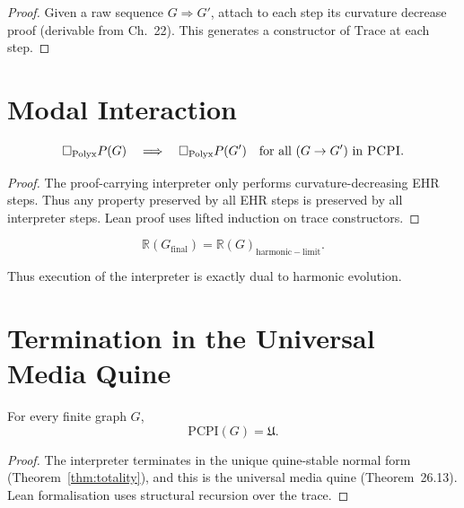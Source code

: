 \begin{proof}
Given a raw sequence $G\Rightarrow G'$, attach to each step its curvature
decrease proof (derivable from Ch.~22).  
This generates a constructor of $\mathrm{Trace}$ at each step.
\end{proof}


\section{Modal Interaction}
\label{sec:modal-interaction}

\begin{theorem}
\[
\Box_{\mathrm{Polyx}} P(G)
\quad\Longrightarrow\quad
\Box_{\mathrm{Polyx}} P(G')
\quad\text{for all $(G\to G')$ in \textsc{PCPI}.}
\]
\end{theorem}

\begin{proof}
The proof-carrying interpreter only performs curvature-decreasing EHR
steps.  
Thus any property preserved by all EHR steps is preserved by all
interpreter steps.  
Lean proof uses lifted induction on trace constructors.
\end{proof}

\begin{theorem}
\[
\mathbb{R}(G_{\mathrm{final}})
=
\mathbb{R}(G)_{\mathrm{harmonic-limit}}.
\]
\end{theorem}

Thus execution of the interpreter is exactly dual to harmonic evolution.


\section{Termination in the Universal Media Quine}
\label{sec:terminate-U}

\begin{theorem}
For every finite graph $G$,  
\[
\mathrm{PCPI}(G)=\mathfrak{U}.
\]
\end{theorem}

\begin{proof}
The interpreter terminates in the unique quine-stable normal form
(Theorem~\ref{thm:totality}), and this is the universal media quine
(Theorem~26.13).  
Lean formalisation uses structural recursion over the trace.
\end{proof}

